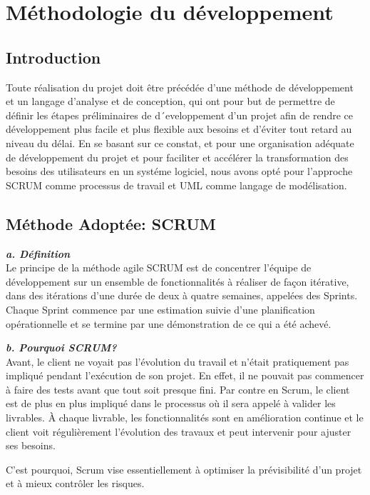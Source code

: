 \newpage
\section{Méthodologie du développement}
\subsection{Introduction}
\noindent
Toute réalisation du projet doit être précédée d’une méthode de développement et un langage d’analyse et de conception, qui ont pour but de permettre de définir les étapes préliminaires de d´eveloppement d’un projet afin de rendre ce développement plus facile et plus flexible aux besoins et d’éviter tout retard au niveau du délai. En se basant sur ce constat, et pour une organisation adéquate de développement du projet et pour faciliter et accélérer la transformation
des besoins des utilisateurs en un systéme logiciel, nous avons opté pour l’approche SCRUM comme processus de travail et UML comme langage de modélisation.

\subsection{Méthode Adoptée: SCRUM}
\noindent
{\small\textbf{\textit{a. Définition}}}\mbox{}\\
Le principe de la méthode agile SCRUM est de concentrer l'équipe de développement sur un ensemble de fonctionnalités à réaliser de façon itérative, dans des itérations d'une durée de deux à quatre semaines, appelées des Sprints. Chaque Sprint commence par une estimation suivie d'une planification opérationnelle et se termine par une démonstration de ce qui a été achevé.

\noindent
{\small\textbf{\textit{b. Pourquoi SCRUM?}}}\mbox{}\\
Avant, le client ne voyait pas l'évolution du travail et n'était pratiquement pas impliqué pendant l'exécution de son projet. En effet, il ne pouvait pas commencer à faire des tests avant que tout soit presque fini. Par contre en Scrum, le client est de plus en plus impliqué dans le processus où il sera appelé à valider les livrables. À chaque livrable, les fonctionnalités sont en amélioration continue et le client voit régulièrement l'évolution des travaux et peut intervenir pour ajuster ses besoins.

\noindent
C'est pourquoi, Scrum vise essentiellement à optimiser la prévisibilité d'un projet et à mieux contrôler les risques.


